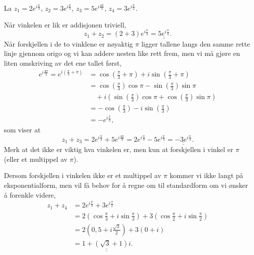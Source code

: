 \documentclass[a4paper,norsk,12pt]{article}
\newcommand{\ans}[1]{\underline{\underline{#1}}}
\newcounter{exa}
\begin{document}
\begin{texample}
	La $z_1 = 2 e^{i\frac{\pi}{3}}$, $z_2 = 3e^{i\frac{\pi}{3}}$, $z_3 = 5e^{i\frac{4\pi}{3}}$, $z_4 = 3e^{i\frac{\pi}{2}}$.

	Når vinkelen er lik er addisjonen triviell,
	\begin{displaymath}
		z_1 + z_2 = (2 + 3) e^{i\frac{\pi}{3}} = \ans{5e^{i\frac{\pi}{3}}}.
	\end{displaymath}
	Når forskjellen i de to vinklene er nøyaktig $\pi$ ligger tallene langs den samme rette linje gjennom origo og vi kan addere nesten like rett frem, men vi må gjøre en liten omskriving av det ene tallet først,
	\begin{align*}
	e^{i\frac{4\pi}{3}} = e^{i\left(\frac{\pi}{3}+\pi\right)} &= \cos\left(\frac{\pi}{3}+\pi\right) + i\sin\left(\frac{\pi}{3}+\pi\right)\\
	&= \cos\left(\frac{\pi}{3}\right)\cos\pi - \sin\left(\frac{\pi}{3}\right)\sin\pi \\
	&\quad+ i\left(\sin\left(\frac{\pi}{3}\right)\cos\pi + \cos\left(\frac{\pi}{3}\right)\sin\pi\right) \\
	&= -\cos\left(\frac{\pi}{3}\right)-i\sin\left(\frac{\pi}{3}\right) \\
	&= -e^{i\frac{\pi}{3}},
	\end{align*}
	som viser at 
	\begin{displaymath}
		z_1 + z_3 = 2e^{i\frac{\pi}{3}} + 5e^{i\frac{4\pi}{3}} = 2e^{i\frac{\pi}{3}} - 5e^{i\frac{\pi}{3}} = \ans{-3e^{i\frac{\pi}{3}}}.
	\end{displaymath}
	Merk at det ikke er viktig hva vinkelen er, men kun at forskjellen i vinkel er $\pi$ (eller et multippel av $\pi$).

	Dersom forskjellen i vinkelen ikke er et multippel av $\pi$ kommer vi ikke langt på eksponentialform, men vil få behov for å regne om til standardform om vi ønsker å forenkle videre,
	\begin{align*}
		z_1 + z_4 &= 2 e^{i\frac{\pi}{3}} + 3e^{i\frac{\pi}{2}} \\
		&= 2\left(\cos\frac{\pi}{3}+i\sin\frac{\pi}{3}\right) + 3\left(\cos\frac{\pi}{2}+i\sin\frac{\pi}{2}\right) \\
		&= 2\left(0,5+i\frac{\sqrt{3}}{2}\right) + 3\left(0 + i\right) \\
		&= \ans{1 +\left(\sqrt{3}+1\right)i}.
	\end{align*}
\end{texample}
\end{document}
